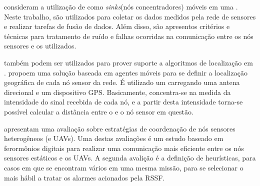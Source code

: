 \cite{Lucchi2007} consideram a utilização de \vants como \emph{sinks}(nós concentradores) móveis em uma \rssf. Neste trabalho, \vants são utilizados para coletar os dados medidos pela rede de sensores e realizar tarefas de fusão de dados. Além disso, são apresentos critérios e técnicas para tratamento de ruído e falhas ocorridas na comunicação entre os nós sensores e os \vants utilizados.

\vants também podem ser utilizados para prover suporte a algoritmos de localização em \rssfs. \cite{Guerrero2009} propoem uma solução baseada em agentes móveis para se definir a localização geográfica de cada nó sensor da rede. É utilizado um \vant carregando uma antena direcional e um dispositivo GPS. Basicamente, concentra-se na medida da intensidade do sinal recebida de cada nó, e a partir desta intensidade torna-se possível calcular a distância entre o \vant e o nó sensor em questão.

\cite{Freitas20092} apresentam uma avaliação sobre estratégias de coordenação de nós sensores heterogêneos (\rssf e UAVs). Uma destas avaliações é um estudo baseado em ferormônios digitais para realizar uma comunicação mais eficiente entre os nós sensores estáticos e os UAVs. A segunda avalição é a definição de heurísticas, para casos em que se encontram vários \vants em uma mesma missão, para se selecionar o \vant mais hábil a tratar os alarmes acionados pela RSSF.



